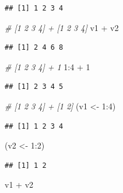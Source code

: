 \documentclass[
]{book}
\newenvironment{Shaded}{\begin{snugshade}}{\end{snugshade}}
\newcommand{\CommentTok}[1]{\textcolor[rgb]{0.56,0.35,0.01}{\textit{#1}}}
\newcommand{\DecValTok}[1]{\textcolor[rgb]{0.00,0.00,0.81}{#1}}
\newcommand{\NormalTok}[1]{#1}
\newcommand{\OtherTok}[1]{\textcolor[rgb]{0.56,0.35,0.01}{#1}}
\newcommand{\SpecialCharTok}[1]{\textcolor[rgb]{0.00,0.00,0.00}{#1}}
\begin{document}
\begin{verbatim}
## [1] 1 2 3 4
\end{verbatim}

\begin{Shaded}
\begin{Highlighting}[]
\CommentTok{\# [1 2 3 4] + [1 2 3 4]}
\NormalTok{v1 }\SpecialCharTok{+}\NormalTok{ v2}
\end{Highlighting}
\end{Shaded}

\begin{verbatim}
## [1] 2 4 6 8
\end{verbatim}

\begin{Shaded}
\begin{Highlighting}[]
\CommentTok{\# [1 2 3 4] + 1}
\DecValTok{1}\SpecialCharTok{:}\DecValTok{4} \SpecialCharTok{+} \DecValTok{1}
\end{Highlighting}
\end{Shaded}

\begin{verbatim}
## [1] 2 3 4 5
\end{verbatim}

\begin{Shaded}
\begin{Highlighting}[]
\CommentTok{\# [1 2 3 4] + [1 2]}
\NormalTok{(v1 }\OtherTok{\textless{}{-}} \DecValTok{1}\SpecialCharTok{:}\DecValTok{4}\NormalTok{)}
\end{Highlighting}
\end{Shaded}

\begin{verbatim}
## [1] 1 2 3 4
\end{verbatim}

\begin{Shaded}
\begin{Highlighting}[]
\NormalTok{(v2 }\OtherTok{\textless{}{-}} \DecValTok{1}\SpecialCharTok{:}\DecValTok{2}\NormalTok{)}
\end{Highlighting}
\end{Shaded}

\begin{verbatim}
## [1] 1 2
\end{verbatim}

\begin{Shaded}
\begin{Highlighting}[]
\NormalTok{v1 }\SpecialCharTok{+}\NormalTok{ v2}
\end{Highlighting}
\end{Shaded}
\end{document}

